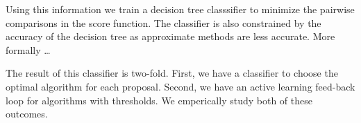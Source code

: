 Using this information we train a decision tree classsifier to minimize the 
pairwise comparisons in the score function.
The classifier is also constrained by the accuracy of the decision tree as 
approximate methods are less accurate.
More formally \ldots

The result of this classifier is two-fold.
First, we have a classifier to choose the optimal algorithm for each proposal.
Second, we have an active learning feed-back loop for algorithms with 
thresholds.
We emperically study both of these outcomes.



